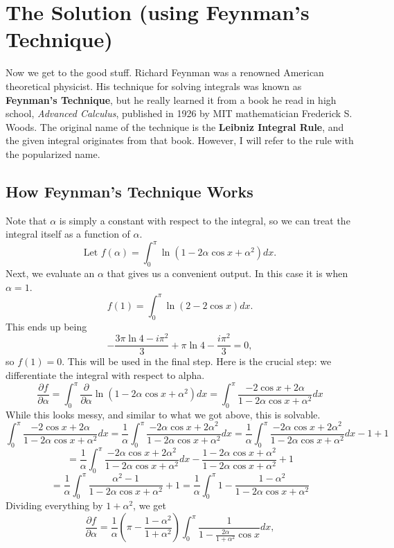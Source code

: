 \documentclass{article}
\begin{document}
\section*{The Solution (using Feynman's Technique)}
\newline Now we get to the good stuff. Richard Feynman was a renowned American theoretical physicist. His technique for solving integrals was known as \textbf{Feynman's Technique}, but he really learned it from a book he read in high school, \textit{Advanced Calculus}, published in 1926 by MIT mathematician Frederick S. Woods. The original name of the technique is the \textbf{Leibniz Integral Rule}, and the given integral originates from that book. However, I will refer to the rule with the popularized name.
\subsection*{How Feynman's Technique Works}
Note that $\alpha$ is simply a constant with respect to the integral, so we can treat the integral itself as a function of $\alpha$.
$$\text{Let } f(\alpha)=\int_{0}^{\pi} \ln(1-2\alpha\cos{x}+\alpha^2)dx.$$
Next, we evaluate an $\alpha$ that gives us a convenient output. In this case it is when $\alpha=1$.
$$f(1)=\int_{0}^{\pi} \ln(2-2\cos{x})dx.$$
This ends up being
$$-\frac{3\pi\ln{4}-i\pi^2}{3}+\pi\ln{4}-\frac{i\pi^2}{3} = 0,$$
so $f(1)=0.$ This will be used in the final step.
\newline Here is the crucial step: we differentiate the integral with respect to alpha.
$$\frac{\partial f}{\partial \alpha} = \int_{0}^{\pi}\frac{\partial}{\partial \alpha}\ln(1-2\alpha\cos{x}+\alpha^2)dx = \int_{0}^{\pi}\frac{-2\cos{x}+2\alpha}{1-2\alpha\cos{x}+\alpha^2}dx$$
While this looks messy, and similar to what we got above, this is solvable.
$$\int_{0}^{\pi}\frac{-2\cos{x}+2\alpha}{1-2\alpha\cos{x}+\alpha^2}dx = \frac{1}{\alpha}\int_{0}^{\pi}\frac{-2\alpha\cos{x}+2\alpha^2}{1-2\alpha\cos{x}+\alpha^2}dx = \frac{1}{\alpha}\int_{0}^{\pi}\frac{-2\alpha\cos{x}+2\alpha^2}{1-2\alpha\cos{x}+\alpha^2}dx - 1 + 1$$
$$=\frac{1}{\alpha}\int_{0}^{\pi}\frac{-2\alpha\cos{x}+2\alpha^2}{1-2\alpha\cos{x}+\alpha^2}dx - \frac{1-2\alpha\cos{x}+\alpha^2}{1-2\alpha\cos{x}+\alpha^2} + 1$$
$$=\frac{1}{\alpha}\int_{0}^{\pi}\frac{\alpha^2-1}{1-2\alpha\cos{x}+\alpha^2} + 1 = \frac{1}{\alpha}\int_{0}^{\pi}1 - \frac{1-\alpha^2}{1-2\alpha\cos{x}+\alpha^2}$$
Dividing everything by $1+\alpha^2$, we get
$$\frac{\partial f}{\partial \alpha} = \frac{1}{\alpha}(\pi-\frac{1-\alpha^2}{1+\alpha^2})\int_{0}^{\pi}\frac{1}{1-\frac{2\alpha}{1+\alpha^2}\cos{x}}dx,$$
\end{document}
